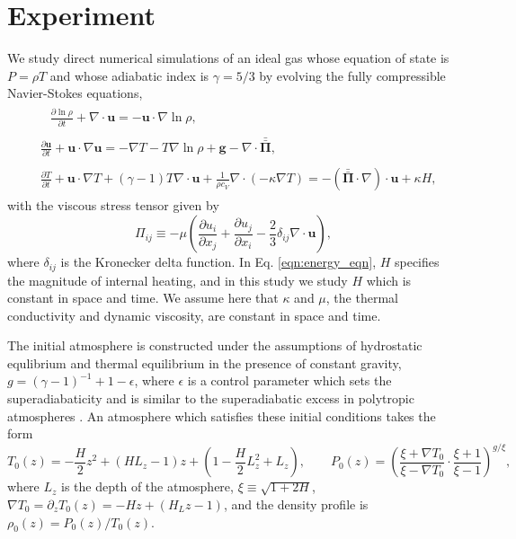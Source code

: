 \documentclass[aps, pre, onecolumn, nofootinbib, notitlepage, groupedaddress, amsfonts, amssymb, amsmath, longbibliography]{revtex4-1}
\newcommand{\grad}{\ensuremath{\nabla}}
\newcommand{\stressT}{\ensuremath{\bm{\bar{\bar{\Pi}}}}}
\begin{document}
\section{Experiment} 
We study direct numerical simulations of an ideal gas whose equation of
state is $P = \rho T$ and whose adiabatic index is $\gamma = 5/3$
by evolving the fully compressible Navier-Stokes equations, 
\label{sec:experiment}
\begin{align}
&\begin{aligned}
&\frac{\partial \ln\rho}{\partial t} + \grad\cdot\bm{u} 
    = -\bm{u}\cdot\grad\ln\rho,
	\label{eqn:continuity_eqn}
\end{aligned}\\
&\begin{aligned}
\frac{\partial\bm{u}}{\partial t} + \bm{u}\cdot\grad\bm{u} =
- \grad T - T \grad \ln \rho + \bm{g} - \grad\cdot\stressT,
\label{eqn:momentum_eqn}
\end{aligned}\\
&\begin{aligned}
\frac{\partial T}{\partial t} + \bm{u}\cdot\grad T
+ (\gamma-1)T\grad\cdot\bm{u} + \frac{1}{\rho c_V}
\grad\cdot\left(-\kappa\grad T\right) = - (\stressT\cdot\grad)\cdot\bm{u} + \kappa H,
	\label{eqn:energy_eqn}
\end{aligned}
\end{align}
with the viscous stress tensor given by
\begin{equation}
\Pi_{ij} \equiv -\mu\left(\frac{\partial u_i}{\partial x_j} + 
\frac{\partial u_j}{\partial x_i} - \frac{2}{3}\delta_{ij}\grad\cdot\bm{u}\right),
	\label{eqn:stress_tensor}
\end{equation}
where $\delta_{ij}$ is the Kronecker delta function.  In Eq. \ref{eqn:energy_eqn}, $H$
specifies the magnitude of internal heating, and in this study we study $H$ which is
constant in space and time.  We assume here that $\kappa$ and $\mu$, the thermal
conductivity and dynamic viscosity, are constant in space and time.

The initial atmosphere is constructed under the assumptions of hydrostatic equlibrium
and thermal equilibrium in the presence of constant gravity, $g = (\gamma - 1)^{-1} + 1 - \epsilon$,
where $\epsilon$ is a control parameter which sets the superadiabaticity and is similar to
the superadiabatic excess in polytropic atmospheres \cite{anders&brown2017, graham1975}.
An atmosphere which satisfies these initial conditions takes the form
\begin{equation}
T_0(z) = -\frac{H}{2} z^2 + (H L_z - 1) z + \left(1 - \frac{H}{2}L_z^2 + L_z\right),
\qquad P_0(z) = \left(\frac{\xi + \grad T_0}{\xi - \grad T_0} \cdot\frac{\xi + 1}{\xi - 1}\right)^{g/\xi},
\end{equation}
where $L_z$ is the depth of the atmosphere, $\xi \equiv \sqrt{1 + 2H}$, 
$\grad T_0 = \partial_z T_0(z) = -H z + (H_Lz - 1)$,
and the density profile is $\rho_0(z) = P_0(z)/T_0(z)$.
\end{document}
